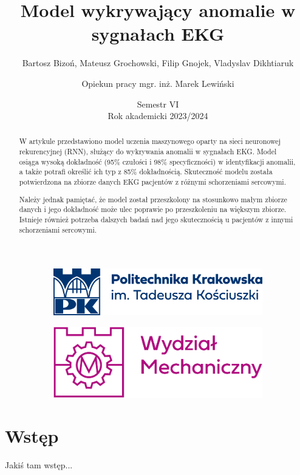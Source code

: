 \documentclass[12pt,a4paper]{article}
\title{\huge{Model wykrywający anomalie w sygnałach EKG } }
\author{Bartosz Bizoń, Mateusz Grochowski, Filip Gnojek, Vladyslav Dikhtiaruk
\and \small{Opiekun pracy mgr. inż. Marek Lewiński}}
\date{Semestr VI \\ Rok akademicki 2023/2024}
\begin{document}
\begin{figure}
    \begin{subfigure}{.49\textwidth}
      \includegraphics[width=.7\linewidth]{images/PK_POZIOM_RGB.png}
      \centering
    \end{subfigure}
    \begin{subfigure}{.49\textwidth}
      \includegraphics[width=.7\linewidth]{WM_RGB.png}
      \centering
    \end{subfigure}
\end{figure}
\maketitle


\begin{abstract}
W artykule przedstawiono model uczenia maszynowego oparty na sieci neuronowej rekurencyjnej (RNN), służący do wykrywania anomalii w sygnałach EKG. Model osiąga wysoką dokładność (95\% czułości i 98\% specyficzności) w identyfikacji anomalii, a także potrafi określić ich typ z 85\% dokładnością. Skuteczność modelu została potwierdzona na zbiorze danych EKG pacjentów z różnymi schorzeniami sercowymi.

Należy jednak pamiętać, że model został przeszkolony na stosunkowo małym zbiorze danych i jego dokładność może ulec poprawie po przeszkoleniu na większym zbiorze. Istnieje również potrzeba dalszych badań nad jego skutecznością u pacjentów z innymi schorzeniami sercowymi.
\end{abstract}

\newpage

\tableofcontents

\newpage
\section{Wstęp}
Jakiś tam wstęp...
\end{document}

